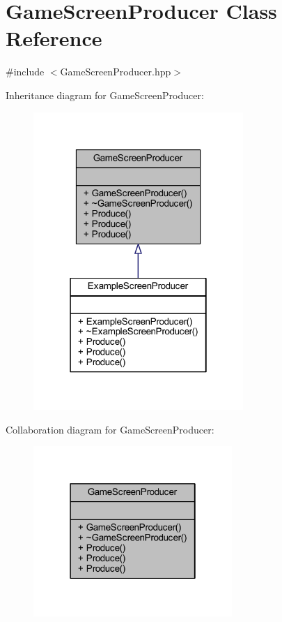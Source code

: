 \hypertarget{class_game_screen_producer}{\section{Game\-Screen\-Producer Class Reference}
\label{class_game_screen_producer}
}


{\ttfamily \#include $<$Game\-Screen\-Producer.\-hpp$>$}



Inheritance diagram for Game\-Screen\-Producer\-:\nopagebreak
\begin{figure}[H]
\begin{center}
\leavevmode
\includegraphics[width=226pt]{class_game_screen_producer__inherit__graph}
\end{center}
\end{figure}


Collaboration diagram for Game\-Screen\-Producer\-:\nopagebreak
\begin{figure}[H]
\begin{center}
\leavevmode
\includegraphics[width=214pt]{class_game_screen_producer__coll__graph}
\end{center}
\end{figure}
